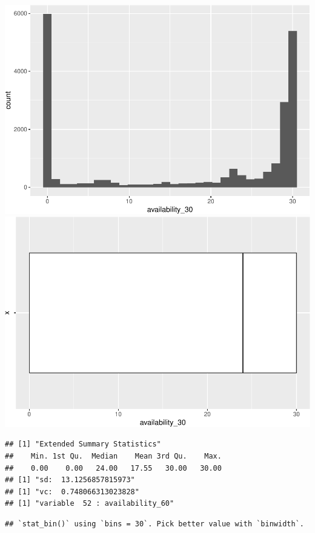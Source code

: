 \includegraphics{anal_files/figure-latex/unnamed-chunk-9-28.pdf}
\includegraphics{anal_files/figure-latex/unnamed-chunk-9-29.pdf}

\begin{verbatim}
## [1] "Extended Summary Statistics"
##    Min. 1st Qu.  Median    Mean 3rd Qu.    Max. 
##    0.00    0.00   24.00   17.55   30.00   30.00 
## [1] "sd:  13.1256857815973"
## [1] "vc:  0.748066313023828"
## [1] "variable  52 : availability_60"
\end{verbatim}

\begin{verbatim}
## `stat_bin()` using `bins = 30`. Pick better value with `binwidth`.
\end{verbatim}

